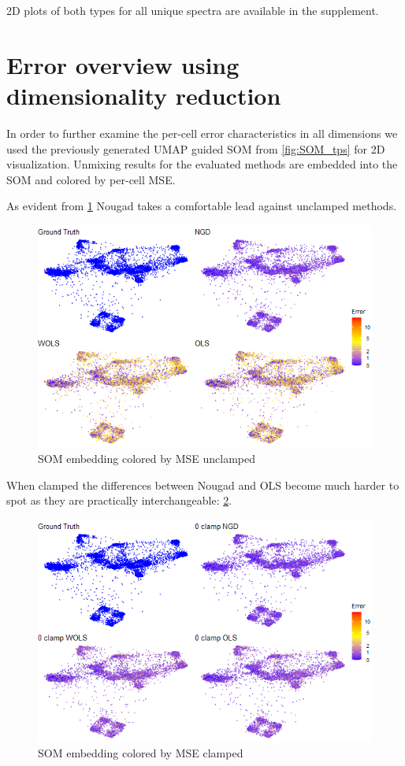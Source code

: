 2D plots of both types for all unique spectra are available in the supplement. 

\section{Error overview using dimensionality reduction}
In order to further examine the per-cell error characteristics in all dimensions we used the previously generated UMAP guided SOM from \cref{fig:SOM_tps} for 2D visualization. Unmixing results for the evaluated methods are embedded into the SOM and colored by per-cell MSE.

As evident from \cref{fig:SOM_noclp} Nougad takes a comfortable lead against unclamped methods. 

\begin{figure}
  \includegraphics[width=1.0\linewidth]{img/SOM_err_noclp2.png}
  \caption{SOM embedding colored by MSE unclamped}
  \label{fig:SOM_noclp}
\end{figure}

When clamped the differences between Nougad and OLS become much harder to spot as they are practically interchangeable: \cref{fig:SOM_clp}. 

\begin{figure}
  \includegraphics[width=1.0\linewidth]{img/SOM_err_clp2.png}
  \caption{SOM embedding colored by MSE clamped}
  \label{fig:SOM_clp}
\end{figure}

